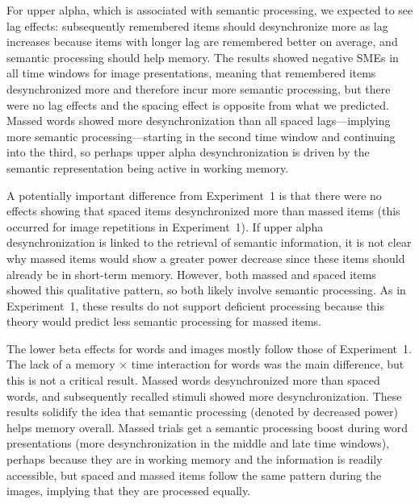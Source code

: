 For upper alpha, which is associated with semantic processing, we expected to see lag effects: subsequently remembered items should desynchronize more as lag increases because items with longer lag are remembered better on average, and semantic processing should help memory.  The results showed negative SMEs in all time windows for image presentations, meaning that remembered items desynchronized more and therefore incur more semantic processing, but there were no lag effects and the spacing effect is opposite from what we predicted.  Massed words showed more desynchronization than all spaced lags---implying more semantic processing---starting in the second time window and continuing into the third, so perhaps upper alpha desynchronization is driven by the semantic representation being active in working memory.

A potentially important difference from Experiment~1 is that there were no effects showing that spaced items desynchronized more than massed items (this occurred for image repetitions in Experiment~1).  If upper alpha desynchronization is linked to the retrieval of semantic information, it is not clear why massed items would show a greater power decrease since these items should already be in short-term memory.  However, both massed and spaced items showed this qualitative pattern, so both likely involve semantic processing.  As in Experiment~1, these results do not support deficient processing because this theory would predict less semantic processing for massed items.


The lower beta effects for words and images mostly follow those of Experiment~1.  The lack of a memory $\times$ time interaction for words was the main difference, but this is not a critical result.  Massed words desynchronized more than spaced words, and subsequently recalled stimuli showed more desynchronization.  These results solidify the idea that semantic processing (denoted by decreased power) helps memory overall.  Massed trials get a semantic processing boost during word presentations (more desynchronization in the middle and late time windows), perhaps because they are in working memory and the information is readily accessible, but spaced and massed items follow the same pattern during the images, implying that they are processed equally.

